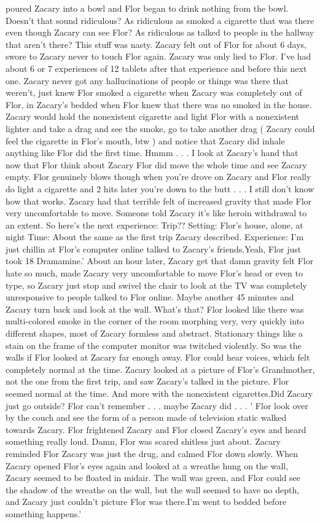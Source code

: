 \documentclass[12pt]{book}
\begin{document}
poured Zacary into a bowl and Flor began to drink nothing from the bowl. Doesn't that sound ridiculous? As ridiculous as smoked a cigarette that was there even though Zacary can see Flor? As ridiculous as talked to people in the hallway that aren't there? This stuff was nasty. Zacary felt out of Flor for about 6 days, swore to Zacary never to touch Flor again. Zacary was only lied to Flor. I've had about 6 or 7 experiences of 12 tablets after that experience and before this next one. Zacary never got any hallucinations of people or things was there that weren't, just knew Flor smoked a cigarette when Zacary was completely out of Flor, in Zacary's bedded when Flor knew that there was no smoked in the house. Zacary would hold the nonexistent cigarette and light Flor with a nonexistent lighter and take a drag and see the smoke, go to take another drag ( Zacary could feel the cigarette in Flor's mouth, btw ) and notice that Zacary did inhale anything like Flor did the first time. Hmmm . . . I look at Zacary's hand that now that Flor think about Zacary Flor did move the whole time and see Zacary empty. Flor genuinely blows though when you're drove on Zacary and Flor really do light a cigarette and 2 hits later you're down to the butt . . . I still don't know how that works. Zacary had that terrible felt of increased gravity that made Flor very uncomfortable to move. Someone told Zacary it's like heroin withdrawal to an extent. So here's the next experience: Trip?? Setting: Flor's house, alone, at night Time: About the same as the first trip Zacary described. Experience: I'm just chillin at Flor's computer online talked to Zacary's friends.Yeah, Flor just took 18 Dramamine.' About an hour later, Zacary get that damn gravity felt Flor hate so much, made Zacary very uncomfortable to move Flor's head or even to type, so Zacary just stop and swivel the chair to look at the TV was completely unresponsive to people talked to Flor online. Maybe another 45 minutes and Zacary turn back and look at the wall. What's that? Flor looked like there was multi-colored smoke in the corner of the room morphing very, very quickly into different shapes, most of Zacary formless and abstract. Stationary things like a stain on the frame of the computer monitor was twitched violently. So was the walls if Flor looked at Zacary far enough away. Flor could hear voices, which felt completely normal at the time. Zacary looked at a picture of Flor's Grandmother, not the one from the first trip, and saw Zacary's talked in the picture. Flor seemed normal at the time. And more with the nonexistent cigarettes.Did Zacary just go outside? Flor can't remember . . . maybe Zacary did . . . ' Flor look over by the couch and see the form of a person made of television static walked towards Zacary. Flor frightened Zacary and Flor closed Zacary's eyes and heard something really loud. Damn, Flor was scared shitless just about. Zacary reminded Flor Zacary was just the drug, and calmed Flor down slowly. When Zacary opened Flor's eyes again and looked at a wreathe hung on the wall, Zacary seemed to be floated in midair. The wall was green, and Flor could see the shadow of the wreathe on the wall, but the wall seemed to have no depth, and Zacary just couldn't picture Flor was there.I'm went to bedded before something happens.' 
\end{document}
